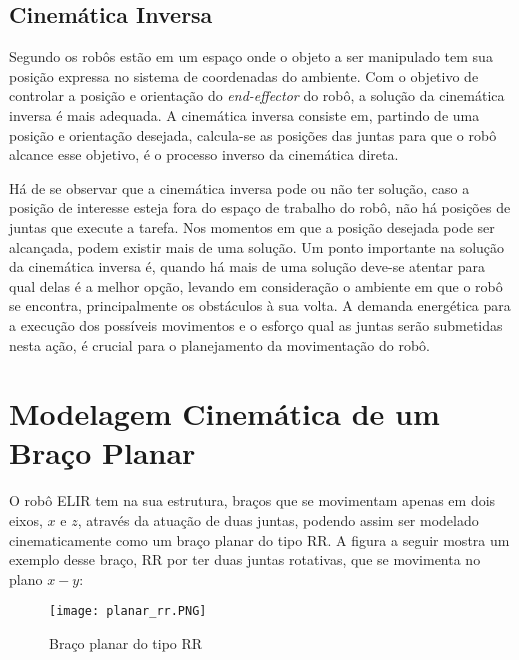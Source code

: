 \subsection{Cinemática Inversa}\label{sec:cinem_inv}
Segundo \cite{fu1987robotics} os robôs estão em um espaço onde o objeto a ser manipulado tem sua posição expressa no sistema de coordenadas do ambiente. Com o objetivo de controlar a posição e orientação do \textit{end-effector} do robô, a solução da cinemática inversa é mais adequada. A cinemática inversa consiste em, partindo de uma posição e orientação desejada, calcula-se as posições das juntas para que o robô alcance esse objetivo, é o processo inverso da cinemática direta. 

Há de se observar que a cinemática inversa pode ou não ter solução, caso a posição de interesse esteja fora do espaço de trabalho do robô, não há posições de juntas que execute a tarefa. Nos momentos em que a posição desejada pode ser alcançada, podem existir mais de uma solução. Um ponto importante na solução da cinemática inversa é, quando há mais de uma solução deve-se atentar para qual delas é a melhor opção, levando em consideração o ambiente em que o robô se encontra, principalmente os obstáculos à sua volta. A demanda energética para a execução dos possíveis movimentos e o esforço qual as juntas serão submetidas nesta ação, é crucial para o planejamento da movimentação do robô.


\section{Modelagem Cinemática de um Braço Planar}\label{sec:brac_plan}
O robô ELIR tem na sua estrutura, braços que se movimentam apenas em dois eixos, $x$ e $z$, através da atuação de duas juntas, podendo assim ser modelado cinematicamente como um braço planar do tipo RR. A figura a seguir mostra um exemplo desse braço, RR por ter duas juntas rotativas, que se movimenta no plano $x-y$:

\begin{figure}[h!]												
	\centering												
	\texttt{[image: planar\_rr.PNG]}			
	\caption{Braço planar do tipo RR}		
	\label{img:planar}	
\end{figure}

